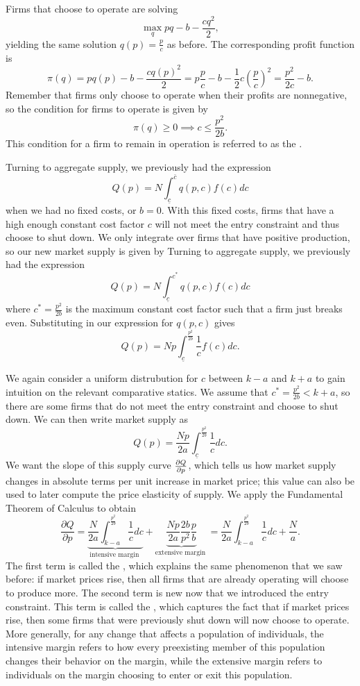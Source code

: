 Firms that choose to operate are solving 
$$\max_q pq - b - \frac{cq^2}{2},$$
yielding the same solution $q(p) = \frac{p}{c}$ as before. The corresponding profit function is 
$$\pi(q) = pq(p) - b - \frac{cq(p)^2}{2} = p\frac{p}{c} - b - \frac{1}{2}c\left(\frac{p}{c}\right)^2 = \frac{p^2}{2c} - b.$$
Remember that firms only choose to operate when their profits are nonnegative, so the condition for firms to operate is given by 
$$\pi(q) \geq 0 \implies c \leq \frac{p^2}{2b}.$$
This condition for a firm to remain in operation is referred to as the .

Turning to aggregate supply, we previously had the expression
$$Q(p)=N \int_{\underline{c}}^{\bar{c}} q(p, c) f(c) d c$$
when we had no fixed costs, or $b=0$. With this fixed costs, firms that have a high enough constant cost factor $c$ will not meet the entry constraint and thus choose to shut down. We only integrate over firms that have positive production, so our new market supply is given by 
Turning to aggregate supply, we previously had the expression
$$Q(p)=N \int_{\underline{c}}^{c^*} q(p, c) f(c) d c$$
where $c^* = \frac{p^2}{2b}$ is the maximum constant cost factor such that a firm just breaks even. Substituting in our expression for $q(p, c)$ gives
$$Q(p) = N p \int_{\underline{c}}^{\frac{p^{2}}{2 b}} \frac{1}{c} f(c) d c.$$

We again consider a uniform distrubution for $c$ between $k-a$ and $k+a$ to gain intuition on the relevant comparative statics. We assume that $c^* = \frac{p^2}{2b} < k+a$, so there are some firms that do not meet the entry constraint and choose to shut down. We can then write market supply as 
$$Q(p) = \frac{Np}{2a} \int_{\underline{c}}^{\frac{p^{2}}{2 b}} \frac{1}{c}d c.$$
We want the slope of this supply curve $\pdv{Q}{p}$, which tells us how market supply changes in absolute terms per unit increase in market price; this value can also be used to later compute the price elasticity of supply. We apply the Fundamental Theorem of Calculus to obtain
$$\frac{\partial Q}{\partial p}=\underbrace{\frac{N}{2 a} \int_{k-a}^{\frac{p^{2}}{2 b}} \frac{1}{c} d c}_{\text {intensive margin }}+\underbrace{\frac{N p}{2 a} \frac{2 b}{p^{2}} \frac{p}{b}}_{\text {extensive margin }} = \frac{N}{2 a} \int_{k-a}^{\frac{p^{2}}{2 b}} \frac{1}{c} d c+\frac{N}{a}.$$
The first term is called the , which explains the same phenomenon that we saw before: if market prices rise, then all firms that are already operating will choose to produce more. The second term is new now that we introduced the entry constraint. This term is called the , which captures the fact that if market prices rise, then some firms that were previously shut down will now choose to operate. More generally, for any change that affects a population of individuals, the intensive margin refers to how every preexisting member of this population changes their behavior on the margin, while the extensive margin refers to individuals on the margin choosing to enter or exit this population.

